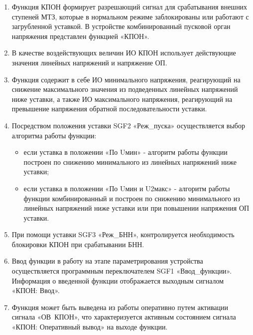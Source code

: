 
\color{black}

\begin{enumerate}

\item
Функция КПОН формирует разрешающий сигнал для срабатывания внешних ступеней МТЗ, которые в нормальном режиме заблокированы или работают с загрубленной уставкой. В устройстве комбинированный пусковой орган напряжения представлен функцией «КПОН».

\item
В качестве воздействующих величин ИО КПОН использует действующие значения линейных напряжений и напряжение ОП.

\item
Функция содержит в себе ИО минимального напряжения, реагирующий на снижение максимального значения из подведенных линейных напряжений ниже уставки, а также ИО максимального напряжения, реагирующий на превышение напряжения обратной последовательности уставки.

\item
Посредством положения уставки SGF2 «Реж\_пуска» осуществляется выбор алгоритма работы функции:
\begin{itemize}
    \item если уставка в положении «По Uмин» - алгоритм работы функции построен по снижению минимального из линейных напряжений ниже уставки;
    \item если уставка в положении «По Uмин и U2макс» - алгоритм работы функции комбинированный и построен по снижению минимального из линейных напряжений ниже уставки или при повышении напряжения ОП уставки.
\end{itemize}

\item
При помощи уставки SGF3 «Реж\_БНН», контролируется необходимость блокировки КПОН при срабатывании БНН.

\item
Ввод функции в работу на этапе параметрирования устройства осуществляется программным переключателем SGF1 «Ввод\_функции». Информация о введенной функции отображается выходным сигналом «КПОН: Ввод».

\item
Функция может быть выведена из работы оперативно путем активации сигнала «ОВ~КПОН», что характеризуется активным состоянием сигнала «КПОН: Оперативный вывод» на выходе функции. 


\end{enumerate}
